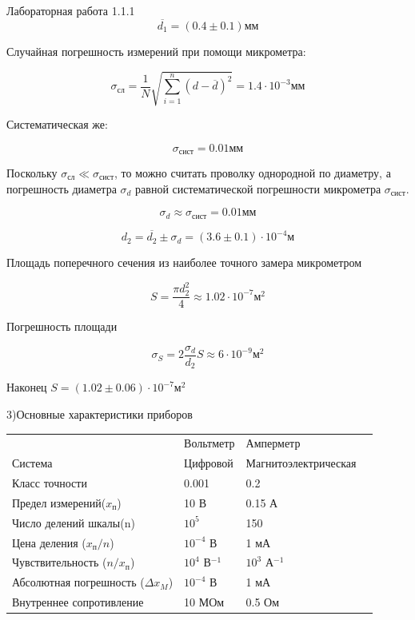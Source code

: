 \documentclass{astroedu-lab}
\begin{document}
\begin{problem}{\large Лабораторная работа 1.1.1}
\begin{equation}
	\overline{d_1} = (0.4 \pm 0.1) мм
\end{equation}

Случайная погрешность измерений при помощи микрометра:

\begin{equation}
	\sigma_{\text{сл}} = \frac{1}{N} \sqrt{\sum_{i=1}^{n}(d - \overline{d})^2} = 1.4 \cdot 10^{-3} \text{мм}
\end{equation}

Систематическая же:

\begin{equation}
	\sigma_{\text{сист}} = 0.01 \text{мм}
\end{equation}

Поскольку $\sigma_{\text{сл}} \ll \sigma_{\text{сист}}$, то можно считать проволку однородной по диаметру, а погрешность диаметра $\sigma_d$ равной систематической погрешности микрометра $\sigma_{\text{сист}}$.

\begin{equation}
	\sigma_d \approx \sigma_{\text{сист}} = 0.01 \text{мм}
\end{equation}

\begin{equation}
	d_2 = \overline{d_2} \pm \sigma_d = (3.6 \pm 0.1) \cdot 10^{-4} \text{м}
\end{equation}

Площадь поперечного сечения из наиболее точного замера микрометром

\begin{equation}
	S = \frac{\pi d_2^2}{4} \approx 1.02 \cdot 10^{-7} \text{м$^2$}
\end{equation}

Погрешность площади

\begin{equation}
	\sigma_S = 2 \frac{\sigma_d}{d_2}S \approx 6 \cdot 10^{-9} \text{м$^2$}
\end{equation}

Наконец $S = (1.02 \pm 0.06) \cdot 10^{-7} \text{м$^2$}$

3)Основные характеристики приборов

\begin{tabular}[t]{|l|l|l|l}
\cline{1-3}
		& Вольтметр & Амперметр \\ \cline{1-3}
Система & Цифровой & Магнитоэлектрическая \\
Класс точности & 0.001 & 0.2 \\
Предел измерений($x_{\text{п}}$) & 10 В & 0.15 А \\
Число делений шкалы(n) & $10^5$ & 150 \\
Цена деления ($x_{\text{п}}/n$) & $10^{-4}$ В & 1 мА \\
Чувствительность ($n/x_{\text{п}}$)&$10^4$ В$^{-1}$&$10^3$ А$^{-1}$ \\
Абсолютная погрешность ($\Delta x_M$)&$10^{-4}$ В&1 мА \\ 
Внутреннее сопротивление & 10 МОм & 0.5 Ом \\
\cline{1-3}
\end{tabular}


\end{problem}
\end{document}
